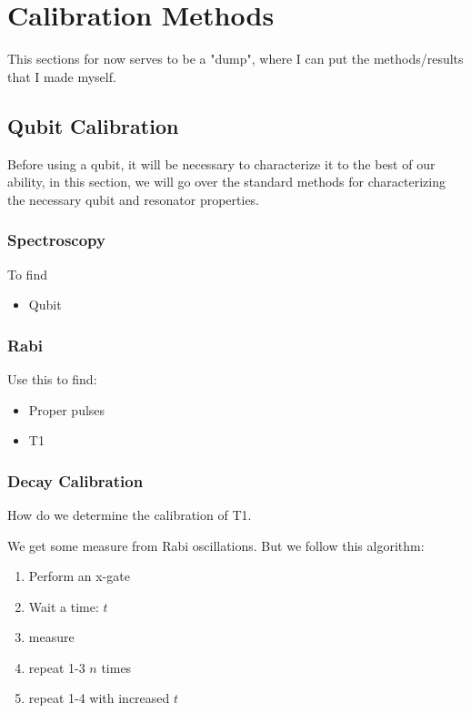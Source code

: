 \chapter{Calibration Methods}
This sections for now serves to be a "dump", where I can put the methods/results that I made myself. 


\section{Qubit Calibration}
Before using a qubit, it will be necessary to characterize it to the best of our ability, in this section, we will go over the standard methods for characterizing the necessary qubit and resonator properties. 

\subsection{Spectroscopy}
To find 

\begin{itemize}
    \item Qubit 
\end{itemize}

\subsection{Rabi}

Use this to find:
\begin{itemize}
    \item Proper pulses
    \item T1
\end{itemize}


\subsection{Decay Calibration}
How do we determine the calibration of T1. 

We get some measure from Rabi oscillations. But we follow this algorithm:

\begin{enumerate}
    \item Perform an x-gate
    \item Wait a time: $t$ 
    \item measure 
    \item repeat 1-3 $n$ times
    \item repeat 1-4 with increased $t$
\end{enumerate}


